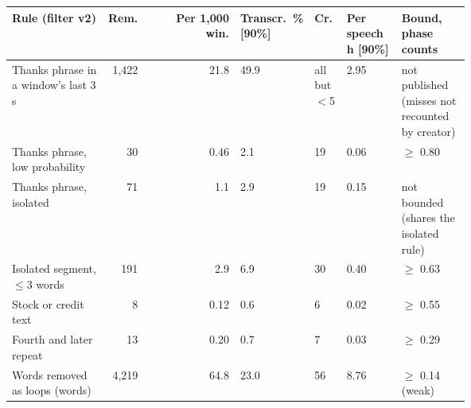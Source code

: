 {\scriptsize\setlength{\tabcolsep}{2pt}
\begin{tabular}{@{}p{0.21\linewidth}rrp{0.12\linewidth}p{0.07\linewidth}p{0.12\linewidth}p{0.15\linewidth}@{}}
\toprule
Rule (filter v2) & Rem. & Per 1{,}000 win. & Transcr.\ \% [90\%] & Cr. & Per speech h [90\%] & Bound, phase counts \\
\midrule
Thanks phrase in a window's last 3 s & 1{,}422 & 21.8 & 49.9\newline[45.2, 54.5] & all but $<$5 & 2.95\newline[2.73, 3.19] & not published (misses not recounted by creator) \\
Thanks phrase, low probability & 30 & 0.46 & 2.1\newline[1.3, 3.1] & 19 & 0.06\newline[0.04, 0.09] & $\geq$ 0.80 \\
Thanks phrase, isolated & 71 & 1.1 & 2.9\newline[1.8, 4.1] & 19 & 0.15\newline[0.08, 0.23] & not bounded (shares the isolated rule) \\
Isolated segment, $\leq$3 words & 191 & 2.9 & 6.9\newline[4.6, 9.5] & 30 & 0.40\newline[0.24, 0.59] & $\geq$ 0.63 \\
Stock or credit text & 8 & 0.12 & 0.6\newline[0.2, 1.1] & 6 & 0.02\newline[0.01, 0.03] & $\geq$ 0.55 \\
Fourth and later repeat & 13 & 0.20 & 0.7\newline[0.2, 1.2] & 7 & 0.03\newline[0.01, 0.05] & $\geq$ 0.29 \\
Words removed as loops (words) & 4{,}219 & 64.8 & 23.0\newline[18.6, 27.4] & 56 & 8.76\newline[4.62, 13.74] & $\geq$ 0.14 (weak) \\
\bottomrule
\end{tabular}}

